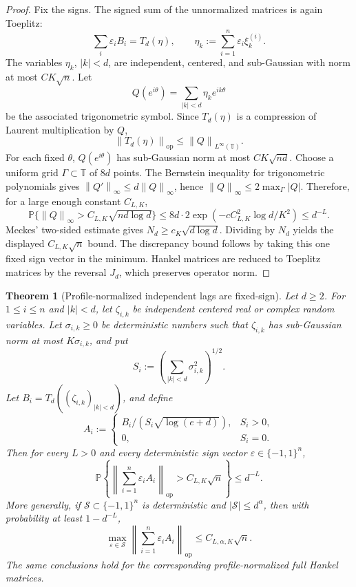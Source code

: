 \documentclass[11pt]{amsart}
\numberwithin{equation}{section}
\newtheorem{theorem}{Theorem}[section]
\theoremstyle{definition}
\theoremstyle{remark}
\newcommand{\T}{\mathbb T}
\newcommand{\op}{\mathrm{op}}
\newcommand{\Prob}{\mathbb P}
\newcommand{\norm}[1]{\left\lVert #1\right\rVert}
\newcommand{\abs}[1]{\left\lvert #1\right\rvert}
\newcommand{\eps}{\varepsilon}
\begin{document}
\begin{proof}
Fix the signs.  The signed sum of the unnormalized matrices is again Toeplitz:
\[
  \sum_i\eps_iB_i=T_d(\eta),\qquad
  \eta_k:=\sum_{i=1}^n\eps_i\xi_k^{(i)} .
\]
The variables \(\eta_k\), \(\abs{k}<d\), are independent, centered, and
sub-Gaussian with norm at most \(C K\sqrt n\). Let
\[
  Q(e^{i\theta})=\sum_{\abs{k}<d}\eta_ke^{ik\theta}
\]
be the associated trigonometric symbol.  Since \(T_d(\eta)\) is a compression of
Laurent multiplication by \(Q\),
\[
  \norm{T_d(\eta)}_{\op}\le\norm{Q}_{L^\infty(\T)}.
\]
For each fixed \(\theta\), \(Q(e^{i\theta})\) has sub-Gaussian norm at most
\(C K\sqrt{nd}\). Choose a uniform grid \(\Gamma\subset\T\) of \(8d\) points.
The Bernstein inequality for trigonometric polynomials gives
\(\norm{Q'}_\infty\le d\norm{Q}_\infty\), hence
\(\norm{Q}_\infty\le2\max_{\Gamma}\abs Q\). Therefore, for a large enough
constant \(C_{L,K}\),
\[
  \Prob\{\norm{Q}_\infty>C_{L,K}\sqrt{nd\log d}\}
  \le 8d\cdot 2\exp(-c C_{L,K}^2\log d/K^2)
  \le d^{-L}.
\]
Meckes' two-sided estimate \cite{Meckes} gives
\(N_d\ge c_K\sqrt{d\log d}\). Dividing by \(N_d\) yields the displayed
\(C_{L,K}\sqrt n\) bound. The discrepancy bound follows by taking this one fixed
sign vector in the minimum.  Hankel matrices are reduced to Toeplitz matrices by
the reversal \(J_d\), which preserves operator norm.
\end{proof}

\begin{theorem}[Profile-normalized independent lags are fixed-sign]
\label{thm:profile-normalized-fixed-sign}
Let \(d\ge2\).  For \(1\le i\le n\) and \(|k|<d\), let
\(\zeta_{i,k}\) be independent centered real or complex random variables.  Let
\(\sigma_{i,k}\ge0\) be deterministic numbers such that \(\zeta_{i,k}\) has
sub-Gaussian norm at most \(K\sigma_{i,k}\), and put
\[
  S_i:=\left(\sum_{|k|<d}\sigma_{i,k}^2\right)^{1/2}.
\]
Let \(B_i=T_d((\zeta_{i,k})_{|k|<d})\), and define
\[
  A_i:=
  \begin{cases}
  B_i/(S_i\sqrt{\log(e+d)}), & S_i>0,\\
  0, & S_i=0.
  \end{cases}
\]
Then for every \(L>0\) and every deterministic sign vector
\(\eps\in\{-1,1\}^n\),
\[
  \Prob\left\{\norm{\sum_{i=1}^n\eps_iA_i}_{\op}
  > C_{L,K}\sqrt n\right\}\le d^{-L}.
\]
More generally, if \(\mathcal S\subset\{-1,1\}^n\) is deterministic and
\(\abs{\mathcal S}\le d^\alpha\), then with probability at least \(1-d^{-L}\),
\[
  \max_{\eps\in\mathcal S}
  \norm{\sum_{i=1}^n\eps_iA_i}_{\op}
  \le C_{L,\alpha,K}\sqrt n .
\]
The same conclusions hold for the corresponding profile-normalized full Hankel
matrices.
\end{theorem}
\end{document}
